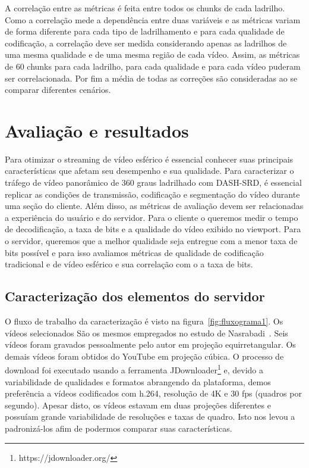 A correlação entre as métricas é feita entre todos os chunks de cada ladrilho. Como a correlação mede a dependência entre duas variáveis e as métricas variam de forma diferente para cada tipo de ladrilhamento e para cada qualidade de codificação, a correlação deve ser medida considerando apenas as ladrilhos de uma mesma qualidade e de uma mesma região de cada vídeo. Assim, as métricas de 60 chunks para cada ladrilho, para cada qualidade e para cada vídeo puderam ser correlacionada. Por fim a média de todas as correções são consideradas ao se comparar diferentes cenários.


\chapter{Avaliação e resultados}\label{Cap:Evaluation}

Para otimizar o streaming de vídeo esférico é essencial conhecer suas principais características que afetam seu desempenho e sua qualidade. Para caracterizar o tráfego de vídeo panorâmico de 360 graus ladrilhado com DASH-SRD, é essencial replicar as condições de transmissão, codificação e segmentação do vídeo durante uma seção do cliente. Além disso, as métricas de avaliação devem ser relacionadas a experiência do usuário e do servidor. Para o cliente o queremos medir o tempo de decodificação, a taxa de bits e a qualidade do vídeo exibido no viewport. Para o servidor, queremos que a melhor qualidade seja entregue com a menor taxa de bits possível e para isso avaliamos métricas de qualidade de codificação tradicional e de vídeo esférico e sua correlação com o a taxa de bits.


\section{Caracterização dos elementos do servidor}

O fluxo de trabalho da caracterização é visto na figura~\ref{fig:fluxograma1}. Os vídeos selecionados São os mesmos empregados no estudo de Nasrabadi~\cite{Nasrabadi2019}. Seis vídeos foram gravados pessoalmente pelo autor em projeção equirretangular. Os demais vídeos foram obtidos do YouTube em projeção cúbica. O processo de download foi executado usando a ferramenta JDownloader\footnote{https://jdownloader.org/} e, devido a variabilidade de qualidades e formatos abrangendo da plataforma, demos preferência a vídeos codificados com h.264, resolução de 4K e 30 fps (quadros por segundo). Apesar disto, os vídeos estavam em duas projeções diferentes e possuíam grande variabilidade de resoluções e taxas de quadro. Isto nos levou a padronizá-los afim de podermos comparar suas características.

